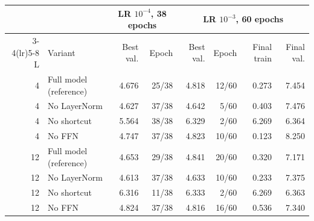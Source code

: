 \begin{tabular}{rlrrrrrr}
\toprule
& & \multicolumn{2}{c}{LR $10^{-4}$, 38 epochs} & \multicolumn{4}{c}{LR $10^{-3}$, 60 epochs} \\
\cmidrule(lr){3-4}\cmidrule(lr){5-8}
L & Variant & Best val. & Epoch & Best val. & Epoch & Final train & Final val. \\
\midrule
4 & Full model (reference) & 4.676 & 25/38 & 4.818 & 12/60 & 0.273 & 7.454 \\
4 & No LayerNorm & 4.627 & 37/38 & 4.642 & 5/60 & 0.403 & 7.476 \\
4 & No shortcut & 5.564 & 38/38 & 6.329 & 2/60 & 6.269 & 6.364 \\
4 & No FFN & 4.747 & 37/38 & 4.823 & 10/60 & 0.123 & 8.250 \\
\midrule
12 & Full model (reference) & 4.653 & 29/38 & 4.841 & 20/60 & 0.320 & 7.171 \\
12 & No LayerNorm & 4.613 & 37/38 & 4.633 & 10/60 & 0.233 & 7.375 \\
12 & No shortcut & 6.316 & 11/38 & 6.333 & 2/60 & 6.269 & 6.363 \\
12 & No FFN & 4.824 & 37/38 & 4.816 & 16/60 & 0.536 & 7.340 \\
\bottomrule
\end{tabular}
